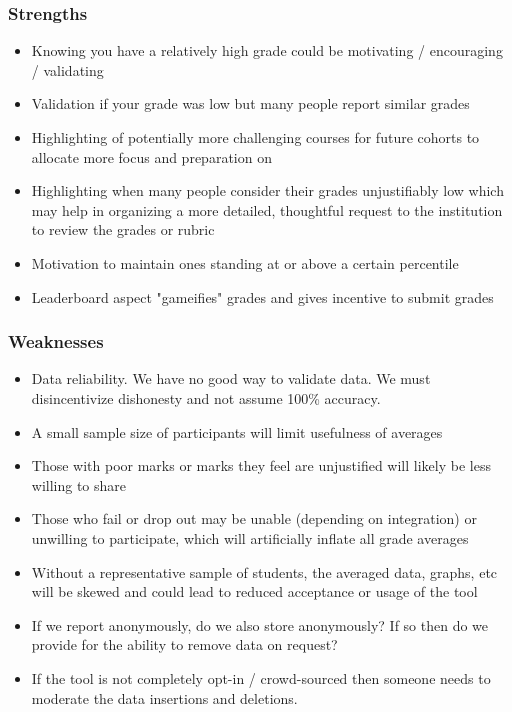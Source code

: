 \documentclass{article}
\begin{document}
\subsubsection{Strengths}
\begin{itemize}
    \item Knowing you have a relatively high grade could be motivating / encouraging / validating
    \item Validation if your grade was low but many people report similar grades
    \item Highlighting of potentially more challenging courses for future cohorts to allocate more focus and preparation on
    \item Highlighting when many people consider their grades unjustifiably low which may help in organizing a more detailed, thoughtful request to the institution to review the grades or rubric
    \item Motivation to maintain ones standing at or above a certain percentile
    \item Leaderboard aspect "gameifies" grades and gives incentive to submit grades
\end{itemize}
\subsubsection{Weaknesses}
\begin{itemize}
    \item Data reliability. We have no good way to validate data. We must disincentivize dishonesty and not assume 100\% accuracy.
    \item A small sample size of participants will limit usefulness of averages
    \item Those with poor marks or marks they feel are unjustified will likely be less willing to share
    \item Those who fail or drop out may be unable (depending on integration) or unwilling to participate, which will artificially inflate all grade averages
    \item Without a   representative sample of students, the averaged data, graphs, etc will be skewed and could lead to reduced acceptance or usage of the tool
    \item If we report anonymously, do we also store anonymously? If so then do we provide for the ability to remove data on request?
    \item If the tool is not completely opt-in / crowd-sourced then someone needs to moderate the data insertions and deletions.
\end{itemize}
\end{document}
